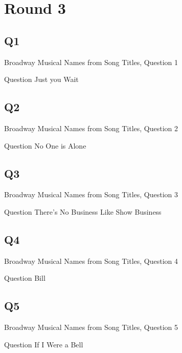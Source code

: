 \documentclass[11pt]{beamer}
\begin{document}
\section{Round 3}
\subsection*{Q1}
\begin{frame}[t]{Broadway Musical Names from Song Titles, Question 1}
\begin{block}{Question}
Just you Wait
\end{block}
\end{frame}
\subsection*{Q2}
\begin{frame}[t]{Broadway Musical Names from Song Titles, Question 2}
\begin{block}{Question}
No One is Alone
\end{block}
\end{frame}
\subsection*{Q3}
\begin{frame}[t]{Broadway Musical Names from Song Titles, Question 3}
\begin{block}{Question}
There's No Business Like Show Business
\end{block}
\end{frame}
\subsection*{Q4}
\begin{frame}[t]{Broadway Musical Names from Song Titles, Question 4}
\begin{block}{Question}
Bill
\end{block}
\end{frame}
\subsection*{Q5}
\begin{frame}[t]{Broadway Musical Names from Song Titles, Question 5}
\begin{block}{Question}
If I Were a Bell
\end{block}
\end{frame}
\end{document}
